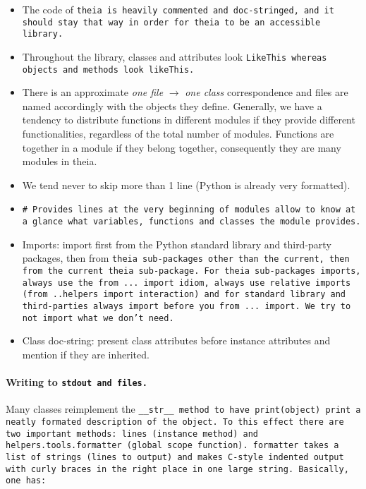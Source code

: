\documentclass{article}
\begin{document}
\begin{itemize}
\item The code of \tt{theia} is heavily commented and doc-stringed, and it should stay that way in order for \tt{theia} to be an accessible library.

\item Throughout the library, classes and attributes look \tt{LikeThis} whereas objects and methods look \tt{likeThis}.

\item There is an approximate \textit{one file} $\rightarrow$ \textit{one class} correspondence and files are named accordingly with the objects they define. Generally, we have a tendency to distribute functions in different modules if they provide different functionalities, regardless of the total number of modules. Functions are together in a module if they belong together, consequently they are many modules in theia.

\item We tend never to skip more than 1 line (Python is already very formatted).

\item \tt{\# Provides} lines at the very beginning of modules allow to know at a glance what variables, functions and classes the module provides.

\item Imports: import first from the Python standard library and third-party packages, then from \tt{theia} sub-packages other than the current, then from the current \tt{theia} sub-package. For \tt{theia} sub-packages imports, always use the \tt{from ... import} idiom, always use relative imports (\tt{from ..helpers import interaction}) and for standard library and third-parties always \tt{import} before you \tt{from ... import}. We try to not import what we don't need.

\item Class doc-string: present class attributes before instance attributes and mention if they are inherited.
\end{itemize}

\paragraph{Writing to \tt{stdout} and files.}Many classes reimplement the \tt{\_\_str\_\_} method to have \tt{print(object)} print a neatly formated description of the object. To this effect there are two important methods: \tt{lines} (instance method) and \tt{helpers.tools.formatter} (global scope function). \tt{formatter} takes a list of strings (lines to output) and makes C-style indented output with curly braces in the right place in one large string. Basically, one has:
\end{document}
